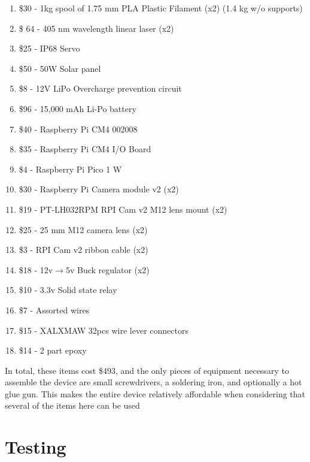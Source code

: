 \documentclass[fleqn,10pt]{SelfArx} %
\begin{document}
	\begin{enumerate}
		
		\item \$30 - 1kg spool of 1.75 mm PLA Plastic Filament (x2) (1.4 kg w/o supports)
		\item \$ 64 - 405 nm wavelength linear laser (x2)
		\item \$25 - IP68 Servo
		\item \$50 - 50W Solar panel
		\item \$8 - 12V LiPo Overcharge prevention circuit
		\item \$96 - 15,000 mAh Li-Po battery
		\item \$40 - Raspberry Pi CM4 002008
		\item \$35 - Raspberry Pi CM4 I/O Board
		\item \$4 - Raspberry Pi Pico 1 W
		\item \$30 - Raspberry Pi Camera module v2 (x2)
		\item \$19 - PT-LH032RPM RPI Cam v2 M12 lens mount (x2)
		\item \$25 - 25 mm M12 camera lens (x2)
		\item \$3 - RPI Cam v2 ribbon cable (x2)
		\item \$18 - 12v$\rightarrow$5v Buck regulator (x2)
		\item \$10 - 3.3v Solid state relay
		\item \$7 - Assorted wires
		\item \$15 - XALXMAW 32pcs wire lever connectors
		\item \$14 - 2 part epoxy 
	\end{enumerate}
	
	In total, these items cost \$493, and the only pieces of equipment necessary to assemble the device are small screwdrivers, a soldering iron, and optionally a hot glue gun. This makes the entire device relatively affordable when considering that several of the items here can be used
	
	\section{Testing}
\end{document}
